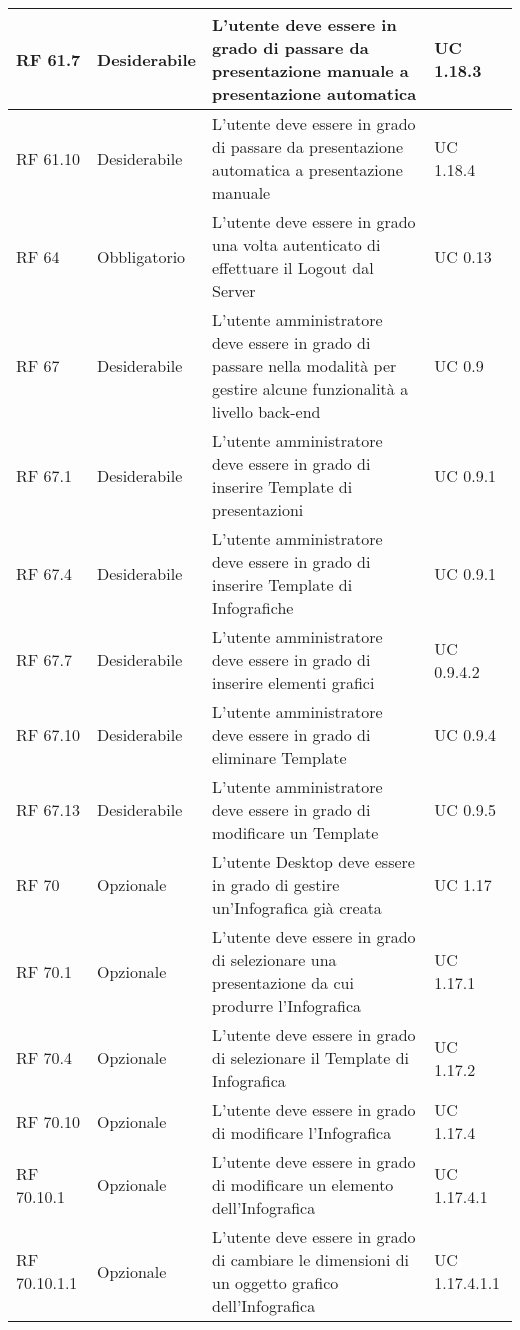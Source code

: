 {\begin{longtable} [c]{| p{2.5cm} | p{2.5cm} | p{6cm} |p{2.5cm}|}
		\hline
		RF 61.7 & Desiderabile & L'utente deve essere in grado di passare da presentazione manuale a presentazione automatica & UC 1.18.3\\
		\hline
		RF 61.10 & Desiderabile & L'utente deve essere in grado di passare da presentazione automatica a presentazione manuale & UC 1.18.4\\
		\hline
		RF 64 & Obbligatorio & L'utente deve essere in grado una volta autenticato di effettuare il Logout\ped{g} dal Server\ped{g} & UC 0.13\\
		\hline
		RF 67 & Desiderabile & L'utente amministratore deve essere in grado di passare nella modalità per gestire alcune funzionalità a livello back-end & UC 0.9\\
		\hline
		RF 67.1 & Desiderabile & L'utente amministratore deve essere in grado di inserire Template\ped{g} di presentazioni & UC 0.9.1\\
		\hline
		RF 67.4 & Desiderabile & L'utente amministratore deve essere in grado di inserire Template\ped{g} di Infografiche\ped{g} & UC 0.9.1\\
		\hline
		RF 67.7 & Desiderabile & L'utente amministratore deve essere in grado di inserire elementi grafici & UC 0.9.4.2\\
		\hline
		RF 67.10 & Desiderabile & L'utente amministratore deve essere in grado di eliminare Template\ped{g} & UC 0.9.4\\
		\hline
		RF 67.13 & Desiderabile & L'utente amministratore deve essere in grado di modificare un Template\ped{g} & UC 0.9.5\\
		\hline
		RF 70 & Opzionale & L'utente Desktop\ped{g} deve essere in grado di gestire un'Infografica\ped{g} già creata & UC 1.17\\
		\hline
		RF 70.1 & Opzionale & L'utente deve essere in grado di selezionare una presentazione da cui produrre l'Infografica\ped{g} & UC 1.17.1\\
		\hline
		RF 70.4 & Opzionale & L'utente deve essere in grado di selezionare il Template\ped{g} di Infografica\ped{g} & UC 1.17.2\\
		\hline
		RF 70.10 & Opzionale & L'utente deve essere in grado di modificare l'Infografica\ped{g} & UC 1.17.4\\
		\hline			
		RF 70.10.1 & Opzionale & L'utente deve essere in grado di modificare un elemento dell'Infografica\ped{g} & UC 1.17.4.1\\
		\hline
		RF 70.10.1.1 & Opzionale & L'utente deve essere in grado di cambiare le dimensioni di un oggetto grafico dell'Infografica\ped{g} & UC 1.17.4.1.1\\

\end{longtable}}
